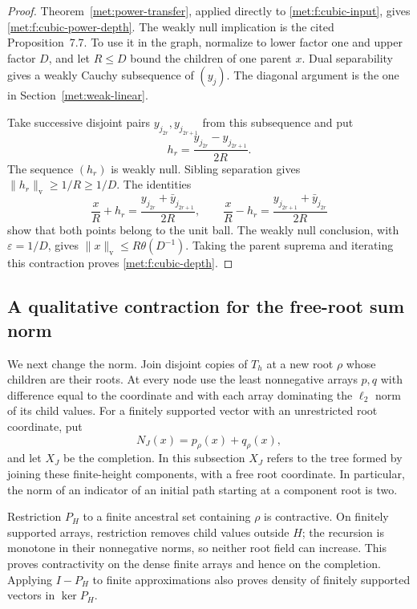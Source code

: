 \begin{proof}
Theorem~\ref{met:power-transfer}, applied directly to
\eqref{met:f:cubic-input}, gives \eqref{met:f:cubic-power-depth}.
The weakly null implication is the cited Proposition~7.7.
To use it in the graph, normalize to lower factor one and upper
factor $D$, and let $R\le D$ bound the children of one parent $x$.
Dual separability gives a weakly Cauchy subsequence of $(y_j)$.
The diagonal argument is the one in Section~\ref{met:weak-linear}.

Take successive disjoint pairs $y_{j_{2r}},y_{j_{2r+1}}$ from this
subsequence and put
\[
 h_r=\frac{y_{j_{2r}}-y_{j_{2r+1}}}{2R}.
\]
The sequence $(h_r)$ is weakly null.  Sibling separation gives
$\|h_r\|_{\mathrm v}\ge1/R\ge1/D$.  The identities
\[
 \frac{x}{R}+h_r
   =\frac{y_{j_{2r}}+\bar y_{j_{2r+1}}}{2R},
 \qquad
 \frac{x}{R}-h_r
   =\frac{y_{j_{2r+1}}+\bar y_{j_{2r}}}{2R}
\]
show that both points belong to the unit ball. The weakly null
conclusion, with $\varepsilon=1/D$, gives $\|x\|_{\mathrm v}
\le R\theta(D^{-1})$. Taking the parent suprema and iterating
this contraction proves \eqref{met:f:cubic-depth}.
\end{proof}

\subsection{A qualitative contraction for the free-root sum norm}

We next change the norm.  Join disjoint copies of $T_h$ at a new root
$\rho$ whose children are their roots.  At every node use the least
nonnegative arrays $p,q$ with difference equal to the coordinate and
with each array dominating the $\ell_2$ norm of its child values.
For a finitely supported vector with an unrestricted root coordinate,
put
\[
 N_J(x)=p_\rho(x)+q_\rho(x),
\]
and let $X_J$ be the completion.  In this subsection
$X_J$ refers to the tree formed by joining these finite-height components,
with a free root coordinate. In particular, the norm of an indicator of an initial
path starting at a component root is two.

Restriction $P_H$ to a finite ancestral set containing $\rho$ is
contractive. On finitely supported arrays, restriction removes child
values outside $H$; the recursion is monotone in their nonnegative
norms, so neither root field can increase. This proves contractivity
on the dense finite arrays and hence on the completion. Applying
$I-P_H$ to finite approximations also proves density of finitely
supported vectors in $\ker P_H$.

